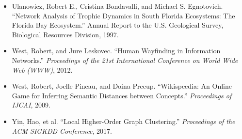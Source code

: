 \documentclass[11pt,a4paper]{article}
\begin{document}
\begin{itemize}[label={}, leftmargin=1.5em, itemindent=-1.5em]
\item Ulanowicz, Robert E., Cristina Bondavalli, and Michael S. Egnotovich. ``Network Analysis of Trophic Dynamics in South Florida Ecosystems: The Florida Bay Ecosystem.'' Annual Report to the U.S. Geological Survey, Biological Resources Division, 1997.
\item West, Robert, and Jure Leskovec. ``Human Wayfinding in Information Networks.'' \emph{Proceedings of the 21st International Conference on World Wide Web (WWW)}, 2012.
\item West, Robert, Joelle Pineau, and Doina Precup. ``Wikispeedia: An Online Game for Inferring Semantic Distances between Concepts.'' \emph{Proceedings of IJCAI}, 2009.
\item Yin, Hao, et al. ``Local Higher-Order Graph Clustering.'' \emph{Proceedings of the ACM SIGKDD Conference}, 2017.
\end{itemize}
\end{document}
